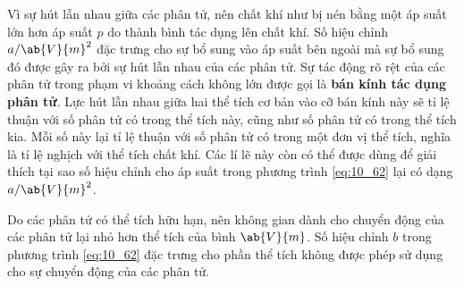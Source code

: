 
Vì sự hút lẫn nhau giữa các phân tử, nên chất khí như bị nén bằng một áp suất lớn hơn áp suất $p$ do thành bình tác dụng lên chất khí. Số hiệu chỉnh $a/\ab{V}{m}^2$ đặc trưng cho sự bổ sung vào áp suất bên ngoài mà sự bổ sung đó được gây ra bởi sự hút lẫn nhau của các phân tử. Sự tác động rõ rệt của các phân tử trong phạm vi khoảng cách không lớn được gọi là \textbf{bán kính tác dụng phân tử}. Lực hút lẫn nhau giữa hai thể tích cơ bản vào cỡ bán kính này sẽ tỉ lệ thuận với số phân tử có trong thể tích này, cũng như số phân tử có trong thể tích kia. Mỗi số này lại tỉ lệ thuận với số phân tử có trong một đơn vị thể tích, nghĩa là tỉ lệ nghịch với thể tích chất khí. Các lí lẽ này còn có thể được dùng để giải thích tại sao số hiệu chỉnh cho áp suất trong phương trình \eqref{eq:10_62} lại có dạng $a/\ab{V}{m}^2$. 


Do các phân tử có thể tích hữu hạn, nên không gian dành cho chuyển động của các phân tử lại nhỏ hơn thể tích của bình $\ab{V}{m}$. Số hiệu chỉnh $b$ trong phương trình \eqref{eq:10_62} đặc trưng cho phần thể tích không được phép sử dụng cho sự chuyển động của các phân tử. 


